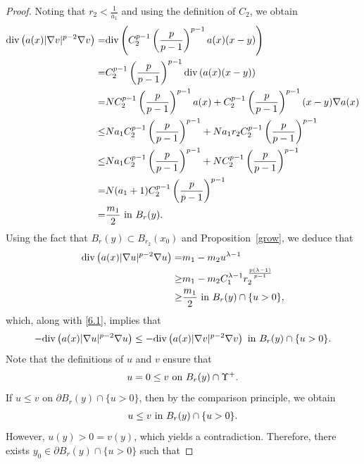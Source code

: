 \documentclass[10pt,a4paper]{amsart}
\begin{document}
\begin{proof}
		Noting that $r_2 < \frac{1}{a_1}$ and using the definition of $C_2$,  we obtain
		\begin{align}
			\mathrm{div}\left(a(x)|\nabla v|^{p-2}\nabla v\right)
			=
			&\mathrm{div}\left(C_2^{p-1}\left(\frac{p}{p-1}\right)^{p-1}a(x)(x-y)\right)
			\notag\\ =
			&C_2^{p-1}\left(\frac{p}{p-1}\right)^{p-1}\mathrm{div}\left( a(x)(x-y)\right)
			\notag\\ =
			&NC_2^{p-1}\left(\frac{p}{p-1}\right)^{p-1}a(x) + C_2^{p-1}\left(\frac{p}{p-1}\right)^{p-1}(x-y)\nabla a(x)
			\notag\\\leq
			& Na_1C_2^{p-1}\left(\frac{p}{p-1}\right)^{p-1} + Na_1r_2C_2^{p-1}\left(\frac{p}{p-1}\right)^{p-1}
			\notag\\ \leq
			&Na_1C_2^{p-1}\left(\frac{p}{p-1}\right)^{p-1} + NC_2^{p-1}\left(\frac{p}{p-1}\right)^{p-1}
			\notag\\ =
			&N(a_1+1)C_2^{p-1}\left(\frac{p}{p-1}\right)^{p-1}
			\notag\\ =
			&\frac{m_1}{2}\   \text{in}\   B_{r}(y).\label{6.1}
		\end{align}
		Using the fact that  $B_r(y) \subset B_{r_2}(x_0)$ and Proposition~\ref{grow}, we deduce that
		\begin{align*}
			\mathrm{div}\left(a(x)|\nabla u|^{p-2}\nabla u\right)
			=
			&  m_1 - m_2 u^{\lambda-1}
			\notag\\ \geq
			&  m_1 -  m_2 C_1^{\lambda-1} r_{2}^{\frac{p(\lambda-1)}{p-1}}
			\notag\\ \geq
			&\frac{m_1}{2}\   \text{in}\   B_r(y) \cap \{u > 0\},%
		\end{align*}
		which, along with \eqref{6.1}, implies that
		\begin{align}
			-\mathrm{div}\left(a(x)|\nabla u|^{p-2}\nabla u\right) \leq -\mathrm{div}\left(a(x)|\nabla v|^{p-2}\nabla v\right)\   \text{in}\   B_r(y) \cap \{u > 0\}.\notag
		\end{align}
		Note that the definitions of $u$ and $v$ ensure that
		\begin{align}
			u=0\leq v \text{ on } B_{r}(y)\cap\Upsilon^{+}.\notag
		\end{align}
		If $u\leq v$ on $\partial B_{r}(y)\cap\{u>0\}$, then by the comparison principle, we obtain
		\begin{align}
			u\leq v  \text{ in } B_{r}(y)\cap\{u>0\}.\notag
		\end{align}
		However, $u(y)>0=v(y)$, which yields a contradiction. Therefore, there exists $y_{0}\in\partial B_{r}(y)\cap\{u>0\}$ such that

\end{proof}
\end{document}
